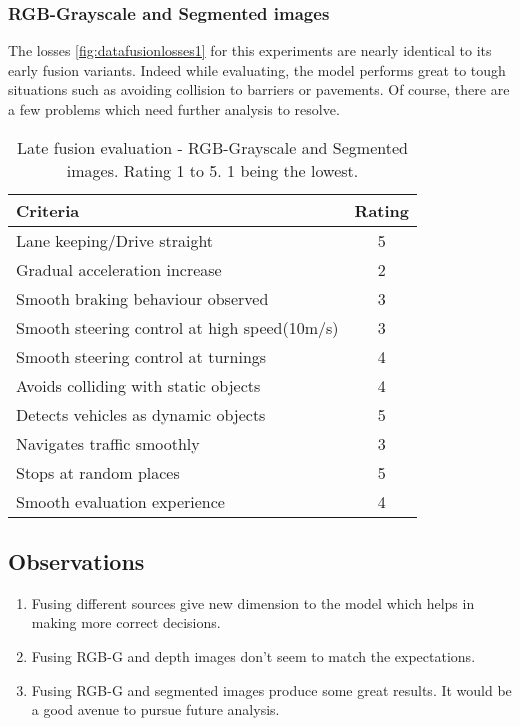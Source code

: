 \subsubsection*{RGB-Grayscale and Segmented images}
The losses \ref{fig:datafusionlosses1} for this experiments are nearly identical to its early fusion variants.
Indeed while evaluating, the model performs great to tough situations such as avoiding
collision to barriers or pavements. Of course, there are a few problems which need further
analysis to resolve.
\begin{table}[!ht]
    \centering
\begin{tabular}{lc}
    \toprule
    Criteria & Rating \\\midrule
    Lane keeping/Drive straight  & 5  \\
    Gradual acceleration increase  & 2\\
    Smooth braking behaviour observed & 3 \\
    Smooth steering control at high speed(10m/s) & 3 \\
    Smooth steering control at turnings & 4\\
    Avoids colliding with static objects & 4 \\
    Detects vehicles as dynamic objects & 5 \\
    Navigates traffic smoothly & 3\\
    Stops at random places & 5 \\
    Smooth evaluation experience & 4 \\\bottomrule
\end{tabular}
\caption{Late fusion evaluation - RGB-Grayscale and Segmented images. Rating 1 to 5. 1
being the lowest.}
\label{table:latefusionrgbseg}
\end{table}
\subsection*{Observations}
\begin{enumerate}
    \item Fusing different sources give new dimension to the model which helps in making
        more correct decisions.
    \item Fusing RGB-G and depth images don't seem to match the expectations.
    \item Fusing RGB-G and segmented images produce some great results. It would be a
        good avenue to pursue future analysis.
\end{enumerate}
